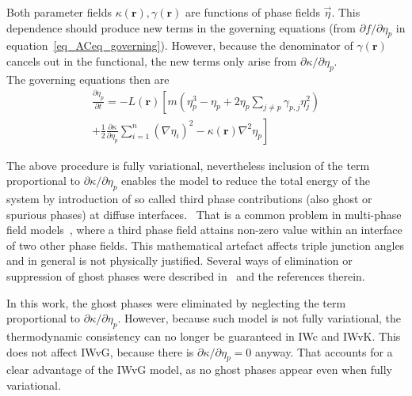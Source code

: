 		Both parameter fields $\kappa(\bm{r}),\gamma(\bm{r})$ are functions of phase fields $\vec{\eta}$. This dependence should produce new terms in the governing equations (from $\partial f/\partial \eta_p$ in equation~\eqref{eq_ACeq_governing}). However, because the denominator of $\gamma(\bm{r})$ cancels out in the functional, the new terms only arise from $\partial \kappa/\partial \eta_p$.\\
		The governing equations then are 
		\begin{equation}
			\begin{split}
				\frac{\partial \eta_p}{\partial t} = -L(\bm{r})\left[ m\left( \eta_p^3-\eta_p +  2\eta_p\sum_{j\neq p}\gamma_{p,j}\eta_j^2 \right) \right. \\ \left. +\frac{1}{2}\frac{\partial \kappa}{\partial\eta_p}\sum_{i=1}^n(\nabla\eta_i)^2 - \kappa(\bm{r})\nabla^2\eta_p \right] 
			\end{split}
		\end{equation}
		
		The above procedure is fully variational, nevertheless inclusion of the term proportional to $\partial \kappa/\partial \eta_p$ enables the model to reduce the total energy of the system by introduction of so called third phase contributions (also ghost or spurious phases) at diffuse interfaces.~\cite{Moelans2008} That is a common problem in multi-phase field models~\cite{Toth2015}, where a third phase field attains non-zero value within an interface of two other phase fields. This mathematical artefact affects triple junction angles and in general is not physically justified. Several ways of elimination or suppression of ghost phases were described in~\cite{Toth2015} and the references therein.
		
		In this work, the ghost phases were eliminated by neglecting the term proportional to $\partial \kappa/\partial \eta_p$. However, because such model is not fully variational, the thermodynamic consistency can no longer be guaranteed in IWc and IWvK. This does not affect IWvG, because there is $\partial \kappa/\partial\eta_p=0$ anyway. That accounts for a clear advantage of the IWvG model, as no ghost phases appear even when fully variational.

